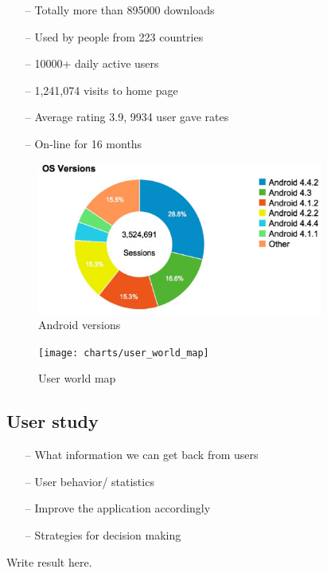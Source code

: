 \begin{itemize}
\item[--]Totally more than 895000 downloads
\item[--]Used by people from 223 countries
\item[--]10000+ daily active users
\item[--]1,241,074 visits to home page
\item[--]Average rating 3.9, 9934 user gave rates
\item[--]On-line for 16 months
\end{itemize}
\begin{figure}[htb]
\centering \includegraphics[height=5cm]{charts/android_versions}
\caption{Android versions \label{chart6}}
\end{figure}

\begin{figure}[htb]
\centering \texttt{[image: charts/user\_world\_map]}
\caption{User world map \label{chart7}}
\end{figure}

\begin{table}[htb]
\caption{Receiver type statistic \label{Table8}}
\begin{center}
\end{center}
\end{table}

\subsection{User study}
\begin{itemize}
\item[--]What information we can get back from users
\item[--]User behavior/ statistics
\item[--]Improve the application accordingly
\item[--]Strategies for decision making
\end{itemize}
Write result here.